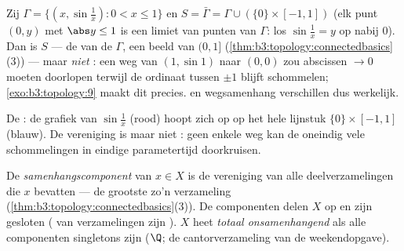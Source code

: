 \begin{example}
\label{ex:b3:topology:sinecurve}
Zij $\Gamma = \{(x, \sin\frac1x) : 0 < x \leq 1\}$ en $S =
\bar\Gamma = \Gamma \cup (\{0\}\times[-1,1])$ (elk punt $(0, y)$
met $\abs y \leq 1$ is een limiet van punten van $\Gamma$: los
$\sin\frac1x = y$ op nabij $0$). Dan is $S$ \emph{}
--- de  van de  $\Gamma$, een  beeld
van $(0, 1]$ (\cref{thm:b3:topology:connectedbasics}(3)) --- maar
\emph{niet }: een weg van $(1, \sin 1)$ naar
$(0,0)$ zou abscissen $\to 0$ moeten doorlopen terwijl de
ordinaat tussen $\pm1$ blijft schommelen;
\cref{exo:b3:topology:9} maakt dit precies.  en
wegsamenhang verschillen dus werkelijk.
\end{example}

\begin{omfigure}

{\small De : de grafiek van
$\sin\frac1x$ (rood) hoopt zich op op het hele lijnstuk
$\{0\}\times[-1,1]$ (blauw). De vereniging is  maar
niet : geen enkele  weg kan de oneindig
vele schommelingen in eindige parametertijd doorkruisen.}
\end{omfigure}

\begin{definition}\label{def:b3:topology:components}
De \emph{samenhangscomponent} van $x
\in X$ is de vereniging van alle  deelverzamelingen
die $x$ bevatten --- de grootste zo'n verzameling
(\cref{thm:b3:topology:connectedbasics}(3)). De componenten delen
$X$ op en zijn gesloten ( van 
verzamelingen zijn ). $X$ heet \emph{totaal
onsamenhangend} als alle componenten singletons zijn ($\Q$; de
cantorverzameling van de weekendopgave).
\end{definition}

